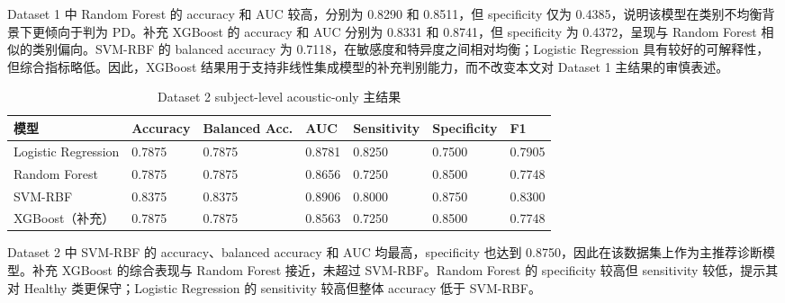 Dataset 1 中 Random Forest 的 accuracy 和 AUC 较高，分别为 0.8290 和 0.8511，但 specificity 仅为 0.4385，说明该模型在类别不均衡背景下更倾向于判为 PD。补充 XGBoost 的 accuracy 和 AUC 分别为 0.8331 和 0.8741，但 specificity 为 0.4372，呈现与 Random Forest 相似的类别偏向。SVM-RBF 的 balanced accuracy 为 0.7118，在敏感度和特异度之间相对均衡；Logistic Regression 具有较好的可解释性，但综合指标略低。因此，XGBoost 结果用于支持非线性集成模型的补充判别能力，而不改变本文对 Dataset 1 主结果的审慎表述。

\begin{table}[H]
\centering
\caption{Dataset 2 subject-level acoustic-only 主结果}
\small
\begin{tabularx}{\textwidth}{lYYYYYY}
\toprule
模型 & Accuracy & Balanced Acc. & AUC & Sensitivity & Specificity & F1 \\
\midrule
Logistic Regression & 0.7875 & 0.7875 & 0.8781 & 0.8250 & 0.7500 & 0.7905 \\
Random Forest & 0.7875 & 0.7875 & 0.8656 & 0.7250 & 0.8500 & 0.7748 \\
SVM-RBF & 0.8375 & 0.8375 & 0.8906 & 0.8000 & 0.8750 & 0.8300 \\
XGBoost（补充） & 0.7875 & 0.7875 & 0.8563 & 0.7250 & 0.8500 & 0.7748 \\
\bottomrule
\end{tabularx}
\end{table}

Dataset 2 中 SVM-RBF 的 accuracy、balanced accuracy 和 AUC 均最高，specificity 也达到 0.8750，因此在该数据集上作为主推荐诊断模型。补充 XGBoost 的综合表现与 Random Forest 接近，未超过 SVM-RBF。Random Forest 的 specificity 较高但 sensitivity 较低，提示其对 Healthy 类更保守；Logistic Regression 的 sensitivity 较高但整体 accuracy 低于 SVM-RBF。
